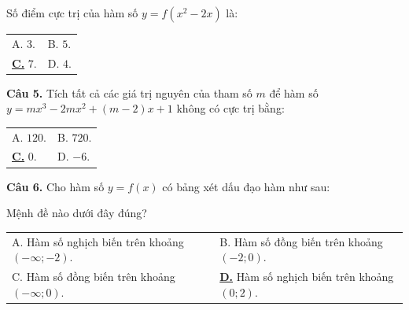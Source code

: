 \documentclass[12pt,a4paper]{article}
\makeatletter
\newcommand{\choiceC}[4]{

    \par\vspace{0.5em}\noindent

    \begin{tabularx}{\textwidth}{@{}X X@{}}

    A. #1 & B. #2 \\[1.2em]

    \underline{\textbf{C.}} #3 & D. #4

    \end{tabularx}

}
\newcommand{\choiceD}[4]{

    \par\vspace{0.5em}\noindent

    \begin{tabularx}{\textwidth}{@{}X X@{}}

    A. #1 & B. #2 \\[1.2em]

    C. #3 & \underline{\textbf{D.}} #4

    \end{tabularx}

}
\makeatother
\begin{document}
\begin{center}


\end{center}

Số điểm cực trị của hàm số $y = f(x^2 - 2x)$ là:

\choiceC{$3$.}{$5$.}{$7$.}{$4$.}



\textbf{Câu 5.} Tích tất cả các giá trị nguyên của tham số $m$ để hàm số $y = mx^3 - 2mx^2 + (m-2)x + 1$ không có cực trị bằng:

\choiceC{$120$.}{$720$.}{$0$.}{$-6$.}



\textbf{Câu 6.} Cho hàm số $y=f(x)$ có bảng xét dấu đạo hàm như sau:

\begin{center}


\end{center}

Mệnh đề nào dưới đây đúng?

\choiceD{Hàm số nghịch biến trên khoảng $(-\infty; -2)$.}{Hàm số đồng biến trên khoảng $(-2; 0)$.}{Hàm số đồng biến trên khoảng $(-\infty; 0)$.}{Hàm số nghịch biến trên khoảng $(0; 2)$.}
\end{document}
